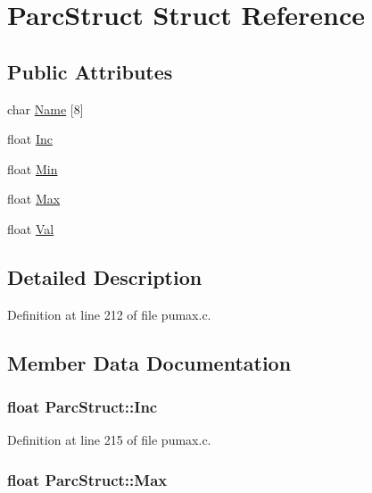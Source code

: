 \hypertarget{struct_parc_struct}{
\section{\-Parc\-Struct \-Struct \-Reference}
\label{struct_parc_struct}
}
\subsection*{\-Public \-Attributes}
\begin{DoxyCompactItemize}
\item 
char \hyperlink{struct_parc_struct_ac9d04b9041919c070a322e95865dd52d}{\-Name} \mbox{[}8\mbox{]}
\item 
float \hyperlink{struct_parc_struct_a8228d63eefa1fb42c060ab069bcf2a1b}{\-Inc}
\item 
float \hyperlink{struct_parc_struct_a2a2d6960e03fa37291f0fff4402f4a38}{\-Min}
\item 
float \hyperlink{struct_parc_struct_a01b1f457258f82282fdeeb6d8d4fbd8b}{\-Max}
\item 
float \hyperlink{struct_parc_struct_a4901f0bf816a2d336307e9e3fcc95d82}{\-Val}
\end{DoxyCompactItemize}


\subsection{\-Detailed \-Description}


\-Definition at line 212 of file pumax.\-c.



\subsection{\-Member \-Data \-Documentation}
\hypertarget{struct_parc_struct_a8228d63eefa1fb42c060ab069bcf2a1b}{
\subsubsection[{\-Inc}]{\setlength{\rightskip}{0pt plus 5cm}float {\bf \-Parc\-Struct\-::\-Inc}}}
\label{struct_parc_struct_a8228d63eefa1fb42c060ab069bcf2a1b}


\-Definition at line 215 of file pumax.\-c.

\hypertarget{struct_parc_struct_a01b1f457258f82282fdeeb6d8d4fbd8b}{
\subsubsection[{\-Max}]{\setlength{\rightskip}{0pt plus 5cm}float {\bf \-Parc\-Struct\-::\-Max}}}
\label{struct_parc_struct_a01b1f457258f82282fdeeb6d8d4fbd8b}


